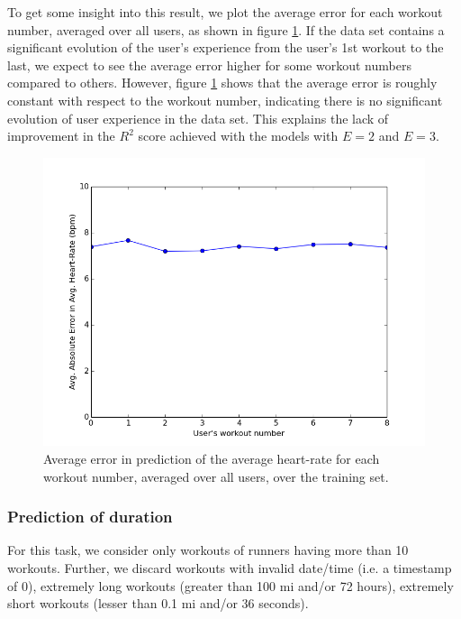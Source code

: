 \documentclass{acm_proc_article-sp}
\begin{document}
To get some insight into this result, we plot the average error for each workout number, averaged over all users, as shown in figure \ref{figAvgHrAvgErrorE1}. If the data set contains a significant evolution of the user's experience from the user's 1st workout to the last, we expect to see the average error higher for some workout numbers compared to others. However, figure \ref{figAvgHrAvgErrorE1} shows that the average error is roughly constant with respect to the workout number, indicating there is no significant evolution of user experience in the data set. This explains the lack of improvement in the $R^2$ score achieved with the models with $E = 2$ and $E = 3$.

\begin{figure}[h]
\centering
\includegraphics[scale=0.35]{../src/plots/avghr_error_vs_workout_E1}
\caption{\label{figAvgHrAvgErrorE1}  Average error in prediction of the average heart-rate for each workout number, averaged over all users, over the training set.}
\end{figure}

\subsubsection{Prediction of duration}

For this task, we consider only workouts of runners having more than 10 workouts. Further, we discard workouts with invalid date/time (i.e. a timestamp of 0), extremely long workouts (greater than 100 mi and/or 72 hours), extremely short workouts (lesser than 0.1 mi and/or 36 seconds).
\end{document}
